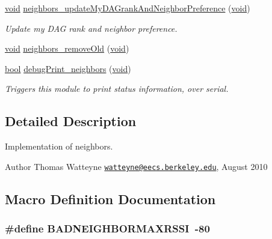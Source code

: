 \begin{DoxyCompactItemize}
\hyperlink{usb__devapi_8h_afabf60e7f57651d6d595a02c75f07cd0}{void} \hyperlink{group___neighbors_ga995345b6dec99e3e20ef4059ed59db34}{neighbors\+\_\+update\+My\+D\+A\+Grank\+And\+Neighbor\+Preference} (\hyperlink{usb__devapi_8h_afabf60e7f57651d6d595a02c75f07cd0}{void})
\begin{DoxyCompactList}\small\item\em Update my D\+AG rank and neighbor preference. \end{DoxyCompactList}\item 
\hyperlink{usb__devapi_8h_afabf60e7f57651d6d595a02c75f07cd0}{void} \hyperlink{group___neighbors_ga3fa32881f8cf7afa1e5334cef8185957}{neighbors\+\_\+remove\+Old} (\hyperlink{usb__devapi_8h_afabf60e7f57651d6d595a02c75f07cd0}{void})
\item 
\hyperlink{_p_e___types_8h_a97a80ca1602ebf2303258971a2c938e2}{bool} \hyperlink{group___neighbors_ga85475c492d943f16dc6da4fea6683352}{debug\+Print\+\_\+neighbors} (\hyperlink{usb__devapi_8h_afabf60e7f57651d6d595a02c75f07cd0}{void})
\begin{DoxyCompactList}\small\item\em Triggers this module to print status information, over serial. \end{DoxyCompactList}\end{DoxyCompactItemize}


\subsection{Detailed Description}
Implementation of neighbors. 

\begin{DoxyAuthor}{Author}
Thomas Watteyne \href{mailto:watteyne@eecs.berkeley.edu}{\tt watteyne@eecs.\+berkeley.\+edu}, August 2010 
\end{DoxyAuthor}


\subsection{Macro Definition Documentation}
\subsubsection[{\texorpdfstring{B\+A\+D\+N\+E\+I\+G\+H\+B\+O\+R\+M\+A\+X\+R\+S\+SI}{BADNEIGHBORMAXRSSI}}]{\setlength{\rightskip}{0pt plus 5cm}\#define B\+A\+D\+N\+E\+I\+G\+H\+B\+O\+R\+M\+A\+X\+R\+S\+SI~-\/80}\hypertarget{group___neighbors_ga2c403faa9006b83e020166536b480025}{}\label{group___neighbors_ga2c403faa9006b83e020166536b480025}


